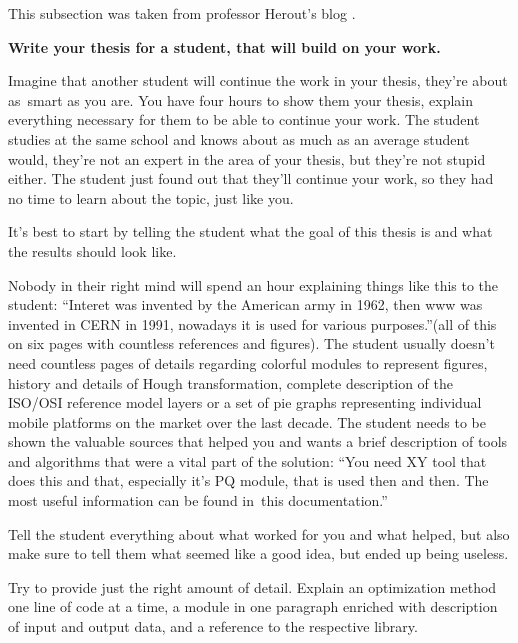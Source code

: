 This subsection was taken from professor Herout's blog \cite{Herout}.

\bigskip
\noindent \bf Write your thesis for a student, that will build on your work. \rm
\bigskip

Imagine that another student will continue the work in your thesis, they're about as~smart as you are. You have four hours to show them your thesis, explain everything necessary for them to be able to continue your work. The student studies at the same school and knows about as much as an average student would, they're not an expert in the area of your thesis, but they're not stupid either. The student just found out that they'll continue your work, so they had no time to learn about the topic, just like you.

It's best to start by telling the student what the goal of this thesis is and what the results should look like.

Nobody in their right mind will spend an hour explaining things like this to the student: ``{\mbox{Interet} was invented by the American army in 1962, then www was invented in CERN in 1991, nowadays it is used for various purposes.''}(all of this on six pages with countless references and figures).
The student usually doesn't need countless pages of details regarding colorful modules to represent figures, history and details of Hough transformation, complete description of the ISO/OSI reference model layers or a set of pie graphs representing individual mobile platforms on the market over the last decade.
The student needs to be shown the valuable sources that helped you and wants a brief description of tools and algorithms that were a vital part of the solution: ``{You need XY tool that does this and that, especially it's PQ module, that is used then and then. The most useful information can be found in~this documentation.}''

Tell the student everything about what worked for you and what helped, but also make sure to tell them what seemed like a good idea, but ended up being useless.

Try to provide just the right amount of detail. Explain an optimization method one line of code at a time, a module in one paragraph enriched with description of input and output data, and a reference to the respective library.

